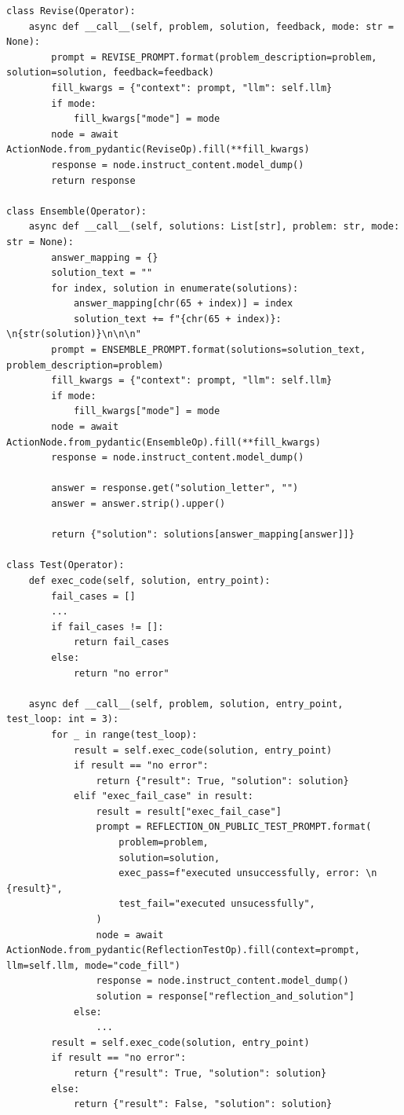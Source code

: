 \documentclass{article} %
\theoremstyle{plain}
\theoremstyle{definition}
\theoremstyle{remark}
\begin{document}
\begin{tcolorbox}[title={\textbf{\small Operators}}, boxrule=1pt, arc=0mm, colback=black!5!white, colframe=black!75!white, breakable, before skip=10pt, after skip=10pt, pad at break=2mm, parbox=false]
\begin{verbatim}
class Revise(Operator):
    async def __call__(self, problem, solution, feedback, mode: str = None):
        prompt = REVISE_PROMPT.format(problem_description=problem, solution=solution, feedback=feedback)
        fill_kwargs = {"context": prompt, "llm": self.llm}
        if mode:
            fill_kwargs["mode"] = mode
        node = await ActionNode.from_pydantic(ReviseOp).fill(**fill_kwargs)
        response = node.instruct_content.model_dump()
        return response

class Ensemble(Operator):
    async def __call__(self, solutions: List[str], problem: str, mode: str = None):
        answer_mapping = {}
        solution_text = ""
        for index, solution in enumerate(solutions):
            answer_mapping[chr(65 + index)] = index
            solution_text += f"{chr(65 + index)}: \n{str(solution)}\n\n\n"
        prompt = ENSEMBLE_PROMPT.format(solutions=solution_text, problem_description=problem)
        fill_kwargs = {"context": prompt, "llm": self.llm}
        if mode:
            fill_kwargs["mode"] = mode
        node = await ActionNode.from_pydantic(EnsembleOp).fill(**fill_kwargs)
        response = node.instruct_content.model_dump()

        answer = response.get("solution_letter", "")
        answer = answer.strip().upper()

        return {"solution": solutions[answer_mapping[answer]]}

class Test(Operator):
    def exec_code(self, solution, entry_point):
        fail_cases = []
        ...
        if fail_cases != []:
            return fail_cases
        else:
            return "no error"

    async def __call__(self, problem, solution, entry_point, test_loop: int = 3):
        for _ in range(test_loop):
            result = self.exec_code(solution, entry_point)
            if result == "no error":
                return {"result": True, "solution": solution}
            elif "exec_fail_case" in result:
                result = result["exec_fail_case"]
                prompt = REFLECTION_ON_PUBLIC_TEST_PROMPT.format(
                    problem=problem,
                    solution=solution,
                    exec_pass=f"executed unsuccessfully, error: \n {result}",
                    test_fail="executed unsucessfully",
                )
                node = await ActionNode.from_pydantic(ReflectionTestOp).fill(context=prompt, llm=self.llm, mode="code_fill")
                response = node.instruct_content.model_dump()
                solution = response["reflection_and_solution"]
            else:
                ...        
        result = self.exec_code(solution, entry_point)
        if result == "no error":
            return {"result": True, "solution": solution}
        else:
            return {"result": False, "solution": solution}


\end{verbatim}
\end{tcolorbox}
\end{document}
